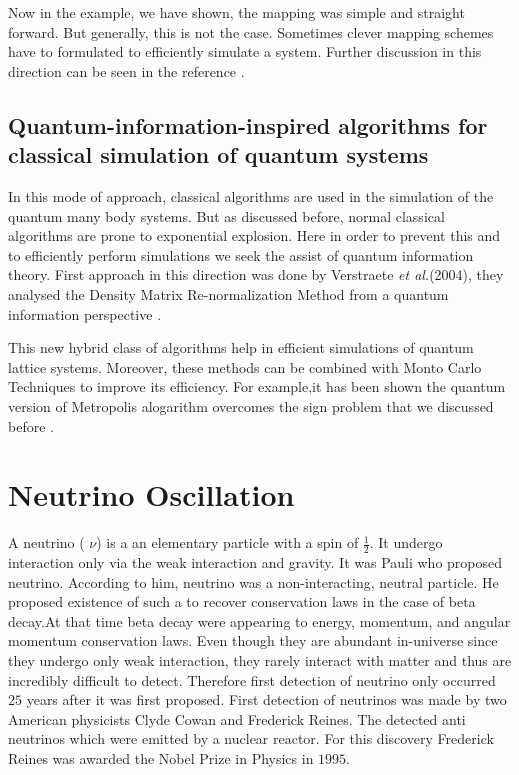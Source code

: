 \documentclass[12pt,a4paper]{report}
\begin{document}
Now in the example, we have shown, the mapping was simple and straight forward. But generally, this is not the case. Sometimes clever mapping schemes have to formulated to efficiently simulate a system. Further discussion in this direction can be seen in the reference \cite{georgescu}.

\section{ Quantum-information-inspired algorithms for classical simulation of quantum systems }
In this mode of approach, classical algorithms are used in the simulation of the quantum many body systems. But as discussed before, normal classical algorithms are prone to exponential explosion. Here in order to prevent this and to efficiently perform simulations we seek the assist of quantum information theory. First approach in this direction was done by Verstraete \emph{et al.}(2004), they analysed the Density Matrix Re-normalization Method from a quantum information perspective \cite{cirac}.\par This new hybrid class of algorithms help in efficient simulations of quantum lattice systems. Moreover, these methods can be combined with Monto Carlo Techniques to improve its efficiency. For example,it has been shown the quantum version of Metropolis alogarithm overcomes the sign problem that we discussed before \cite{temme2011}.
\newpage
\thispagestyle{empty}
\mbox{}
\newpage


\chapter{Neutrino Oscillation}\label{sec2}

A neutrino  ( $\nu$) is a an elementary particle with a spin of $\frac{1}{2}$. It undergo interaction only via the weak interaction and gravity. It was Pauli who proposed neutrino. According to him, neutrino was a non-interacting, neutral particle. He proposed existence of such a to recover conservation laws in the case of beta decay.At that time beta decay were appearing to energy, momentum, and angular momentum conservation laws. Even though they are abundant in-universe since they undergo only weak interaction, they rarely interact with matter and thus are incredibly difficult to detect. Therefore first detection of neutrino only occurred $25$ years after it was first proposed. First detection of neutrinos was made by two American physicists Clyde Cowan and Frederick Reines. The detected anti neutrinos which were emitted by a nuclear reactor. For this discovery Frederick Reines was awarded the Nobel Prize in Physics in $1995$. \par
\end{document}
